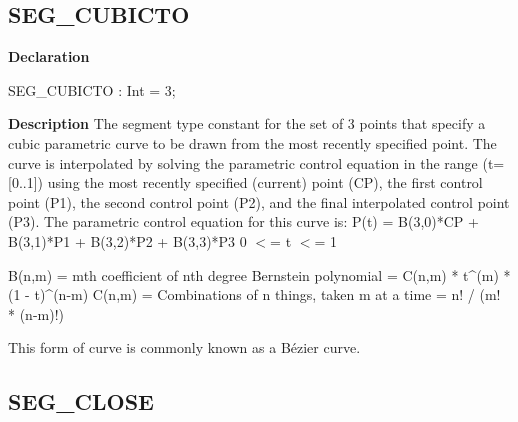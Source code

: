 \documentclass{report}
\newif\ifpdf
\begin{document}
\subsection*{SEG{\_}CUBICTO}
\fi
\label{NewPascal.GUI.Geom-SEG_CUBICTO}
\begin{list}{}{
\setlength{\itemindent}{0cm}
\setlength{\listparindent}{0cm}
\setlength{\leftmargin}{\evensidemargin}
\addtolength{\leftmargin}{\tmplength}
\settowidth{\labelsep}{X}
\addtolength{\leftmargin}{\labelsep}
\setlength{\labelwidth}{\tmplength}
}
\item[\textbf{Declaration}\hfill]
\ifpdf
\begin{flushleft}
\fi
\begin{ttfamily}
SEG{\_}CUBICTO    : Int = 3;\end{ttfamily}

\ifpdf
\end{flushleft}
\fi

\par
\item[\textbf{Description}]
The segment type constant for the set of 3 points that specify a cubic parametric curve to be drawn from the most recently specified point. The curve is interpolated by solving the parametric control equation in the range (t=[0..1]) using the most recently specified (current) point (CP), the first control point (P1), the second control point (P2), and the final interpolated control point (P3). The parametric control equation for this curve is: P(t) = B(3,0)*CP + B(3,1)*P1 + B(3,2)*P2 + B(3,3)*P3 0 {$<$}= t {$<$}= 1

B(n,m) = mth coefficient of nth degree Bernstein polynomial = C(n,m) * t{\^{}}(m) * (1 {-} t){\^{}}(n{-}m) C(n,m) = Combinations of n things, taken m at a time = n! / (m! * (n{-}m)!)

This form of curve is commonly known as a Bézier curve.

\end{list}
\ifpdf
\subsection*{\large{\textbf{SEG{\_}CLOSE}}\normalsize\hspace{1ex}\hrulefill}
\else
\end{document}
